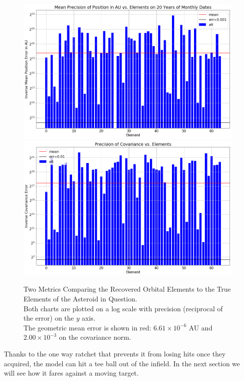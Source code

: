 \begin{figure}[h]
\begin{center}
\includegraphics[width=1.0\textwidth]{../figs/search_known/unperturbed/near_ast_dist.png}
\includegraphics[width=1.0\textwidth]{../figs/search_known/unperturbed/near_ast_cov.png}
\end{center}
\caption[Two Metrics Comparing the Recovered Orbital Elements to True Elements]
{Two Metrics Comparing the Recovered Orbital Elements to the True Elements of the Asteroid in Question.\\
Both charts are plotted on a log scale with precision (reciprocal of the error) on the $y$ axis.\\
The geometric mean error is shown in red: $6.61 \times 10^{-6}$ AU and $2.00 \times 10^{-3}$ on the covariance norm.}
\label{fig:UnperturbedNearAst}
\end{figure}
Thanks to the one way ratchet that prevents it from losing hits once they acquired, 
the model can hit a tee ball out of the infield.
In the next section we will see how it fares against a moving target.


